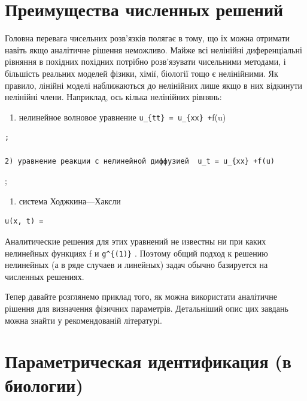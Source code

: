 \documentclass[
  ukrainian,
]{article}
\providecommand{\tightlist}{%
  \setlength{\itemsep}{0pt}\setlength{\parskip}{0pt}}
\begin{document}
\section{Преимущества численных
решений}\label{ux43fux440ux435ux438ux43cux443ux449ux435ux441ux442ux432ux430-ux447ux438ux441ux43bux435ux43dux43dux44bux445-ux440ux435ux448ux435ux43dux438ux439}

Головна перевага чисельних розв'язків полягає в тому, що їх можна
отримати навіть якщо аналітичне рішення неможливо. Майже всі нелінійні
диференціальні рівняння в похідних похідних потрібно розв'язувати
чисельними методами, і більшість реальних моделей фізики, хімії,
біології тощо є нелінійними. Як правило, лінійні моделі наближаються до
нелінійних лише якщо в них відкинути нелінійні члени. Наприклад, ось
кілька нелінійних рівнянь:

\begin{enumerate}
\def\labelenumi{\arabic{enumi})}
\tightlist
\item
  нелинейное волновое уравнение \texttt{u\_\{tt\}\ =\ u\_\{xx\}\ +}f(u)
\end{enumerate}

\begin{verbatim}
;

2) уравнение реакции с нелинейной диффузией  u_t = u_{xx} +f(u)
\end{verbatim}

;

\begin{enumerate}
\def\labelenumi{\arabic{enumi})}
\setcounter{enumi}{2}
\tightlist
\item
  система Ходжкина---Хаксли
\end{enumerate}

\begin{verbatim}
u(x, t) =
\end{verbatim}

Аналитические решения для этих уравнений не известны ни при каких
нелинейных функциях f и \texttt{g\^{}\{(1)\}} . Поэтому общий подход к
решению нелинейных (а в ряде случаев и линейных) задач обычно базируется
на численных решениях.

Тепер давайте розглянемо приклад того, як можна використати аналітичне
рішення для визначення фізичних параметрів. Детальніший опис цих завдань
можна знайти у рекомендованій літературі.

\section{Параметрическая идентификация (в
биологии)}\label{ux43fux430ux440ux430ux43cux435ux442ux440ux438ux447ux435ux441ux43aux430ux44f-ux438ux434ux435ux43dux442ux438ux444ux438ux43aux430ux446ux438ux44f-ux432-ux431ux438ux43eux43bux43eux433ux438ux438}
\end{document}
